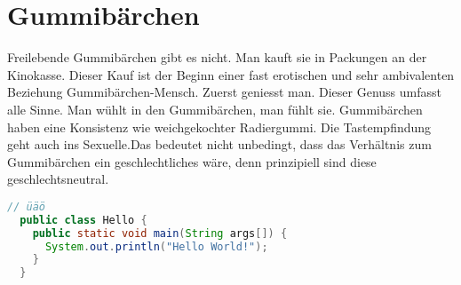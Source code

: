 
\chapter{Gummibärchen}

Freilebende Gummibärchen gibt es nicht. Man kauft sie in Packungen an der Kinokasse. Dieser Kauf ist der Beginn einer fast erotischen und sehr ambivalenten Beziehung Gummibärchen-Mensch. Zuerst geniesst man. Dieser Genuss umfasst alle Sinne. Man wühlt in den Gummibärchen, man fühlt sie. Gummibärchen haben eine Konsistenz wie weichgekochter Radiergummi. Die Tastempfindung geht auch ins Sexuelle.Das bedeutet nicht unbedingt, dass das Verhältnis zum Gummibärchen ein geschlechtliches wäre, denn prinzipiell sind diese geschlechtsneutral.

\begin{lstlisting}[gobble=2,language=Java]
  // üäö
  public class Hello {
    public static void main(String args[]) {
      System.out.println("Hello World!");
    }
  }
\end{lstlisting}